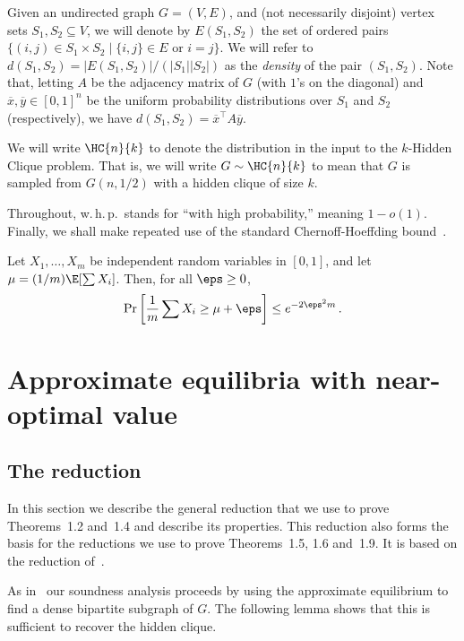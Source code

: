 Given an undirected graph $G=(V,E)$, and (not necessarily disjoint) vertex sets $S_1,S_2\subseteq V$, we will denote by $E(S_1,S_2)$ the set of ordered pairs $\{(i,j)\in S_1\times S_2\mid \{i,j\}\in E\text{ or }i=j\}$. We will refer to $d(S_1,S_2)=|E(S_1,S_2)|/(|S_1||S_2|)$ as the \emph{density} of the pair $(S_1,S_2)$.  Note that, letting $A$ be the adjacency matrix of $G$  (with $1$'s on the diagonal) and $\overline{x}, \overline{y} \in [0,1]^n$ be the uniform probability distributions over $S_1$ and $S_2$ (respectively), we have $d(S_1, S_2) = \overline{x}^{\top} A \overline{y}$.

We will write $\HC{n}{k}$ to denote the distribution in the input to the $k$-Hidden Clique problem. That is, we will write $G\sim\HC{n}{k}$ to mean that $G$ is sampled from $G(n,1/2)$ with a hidden clique of size $k$.

Throughout, w.\,h.\,p.~stands for ``with high probability,'' meaning $1-o(1)$.  Finally, we
shall make repeated use of the standard Chernoff-Hoeffding
bound~\cite{Hoeff63}.

\begin{lemma}
  \label{lemma:chernoff}
  Let $X_1, \ldots, X_m$ be independent random variables in $[0,1]$, and let
  $\mu = ({1}/{m}) \E[ \sum X_i]$.  Then, for all $\eps \ge 0$,
  $$
  \Pr\left[ \frac{1}{m} \sum X_i \ge \mu + \eps \right] \le e^{-2\eps^2 m}\,.
  $$
\end{lemma}


\section{Approximate equilibria with near-optimal value}
\label{sec:goodvalue}

\subsection{The reduction}\label{sec:reduction}

In this section we describe the general reduction that we use to prove
Theorems~1.2 and~1.4 and
describe its properties. This reduction also forms the basis for the reductions we use to prove Theorems~1.5, 1.6  and~1.9. It is based on the reduction of~\cite{HK11}.

As in~\cite{HK11} our soundness analysis proceeds by using the approximate equilibrium to find a dense
bipartite subgraph of $G$. The following lemma shows %
that this is sufficient to recover the hidden clique.

